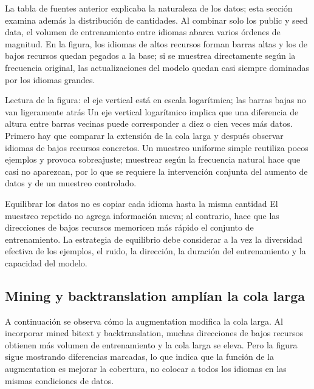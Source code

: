 La tabla de fuentes anterior explicaba la naturaleza de los datos; esta sección examina además la distribución de cantidades. Al combinar solo los public y seed data, el volumen de entrenamiento entre idiomas abarca varios órdenes de magnitud. En la figura, los idiomas de altos recursos forman barras altas y los de bajos recursos quedan pegados a la base; si se muestrea directamente según la frecuencia original, las actualizaciones del modelo quedan casi siempre dominadas por los idiomas grandes.


\begin{knowledgebox}{Lectura de la figura: el eje vertical está en escala logarítmica; las barras bajas no van ligeramente atrás}
Un eje vertical logarítmico implica que una diferencia de altura entre barras vecinas puede corresponder a diez o cien veces más datos. Primero hay que comparar la extensión de la cola larga y después observar idiomas de bajos recursos concretos. Un muestreo uniforme simple reutiliza pocos ejemplos y provoca sobreajuste; muestrear según la frecuencia natural hace que casi no aparezcan, por lo que se requiere la intervención conjunta del aumento de datos y de un muestreo controlado.
\end{knowledgebox}

\begin{warningbox}{Equilibrar los datos no es copiar cada idioma hasta la misma cantidad}
El muestreo repetido no agrega información nueva; al contrario, hace que las direcciones de bajos recursos memoricen más rápido el conjunto de entrenamiento. La estrategia de equilibrio debe considerar a la vez la diversidad efectiva de los ejemplos, el ruido, la dirección, la duración del entrenamiento y la capacidad del modelo.
\end{warningbox}

\subsection{Mining y backtranslation amplían la cola larga}

A continuación se observa cómo la augmentation modifica la cola larga. Al incorporar mined bitext y backtranslation, muchas direcciones de bajos recursos obtienen más volumen de entrenamiento y la cola larga se eleva. Pero la figura sigue mostrando diferencias marcadas, lo que indica que la función de la augmentation es mejorar la cobertura, no colocar a todos los idiomas en las mismas condiciones de datos.

